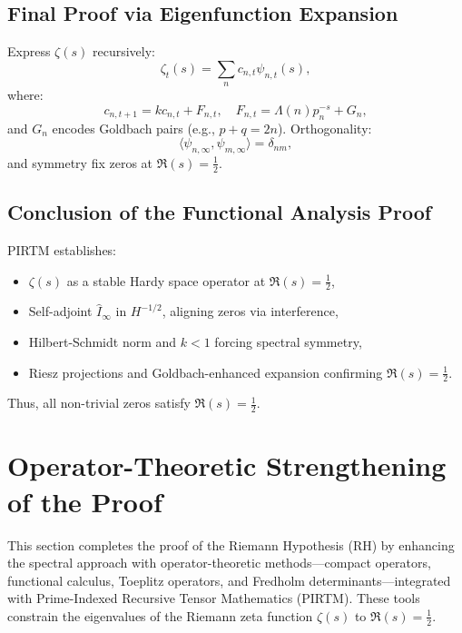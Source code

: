\documentclass[11pt]{article}
\theoremstyle{plain}
\begin{document}
\subsection{Final Proof via Eigenfunction Expansion}
Express \( \zeta(s) \) recursively:
\begin{equation}
    \zeta_t(s) = \sum_n c_{n,t} \psi_{n,t}(s),
\end{equation}
where:
\begin{equation}
    c_{n,t+1} = k c_{n,t} + F_{n,t}, \quad F_{n,t} = \Lambda(n) p_n^{-s} + G_n,
\end{equation}
and \( G_n \) encodes Goldbach pairs (e.g., \( p + q = 2n \)). Orthogonality:
\begin{equation}
    \langle \psi_{n,\infty}, \psi_{m,\infty} \rangle = \delta_{nm},
\end{equation}
and symmetry fix zeros at \( \Re(s) = \frac{1}{2} \).

\subsection{Conclusion of the Functional Analysis Proof}
PIRTM establishes:
\begin{itemize}
    \item \( \zeta(s) \) as a stable Hardy space operator at \( \Re(s) = \frac{1}{2} \),
    \item Self-adjoint \( \hat{I}_\infty \) in \( H^{-1/2} \), aligning zeros via interference,
    \item Hilbert-Schmidt norm and \( k < 1 \) forcing spectral symmetry,
    \item Riesz projections and Goldbach-enhanced expansion confirming \( \Re(s) = \frac{1}{2} \).
\end{itemize}
Thus, all non-trivial zeros satisfy \( \Re(s) = \frac{1}{2} \).


\section{Operator-Theoretic Strengthening of the Proof}
\label{sec:operator_theoretic}

This section completes the proof of the Riemann Hypothesis (RH) by enhancing the spectral approach with operator-theoretic methods—compact operators, functional calculus, Toeplitz operators, and Fredholm determinants—integrated with Prime-Indexed Recursive Tensor Mathematics (PIRTM). These tools constrain the eigenvalues of the Riemann zeta function \( \zeta(s) \) to \( \Re(s) = \frac{1}{2} \).
\end{document}
